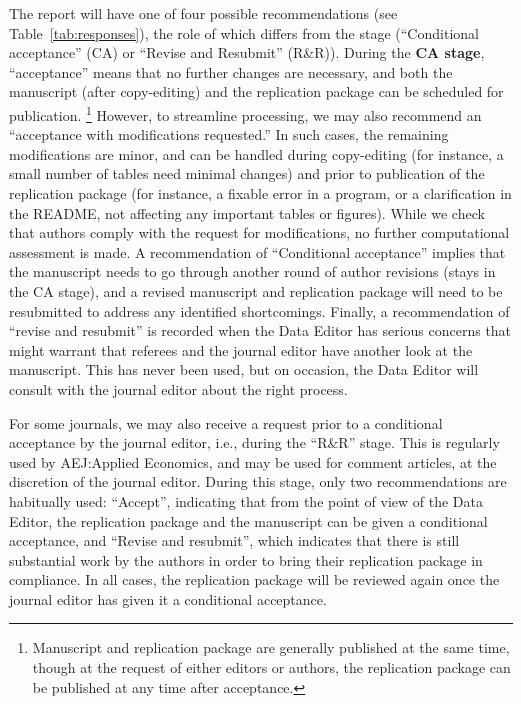 The report will have  one of four possible recommendations (see Table~\ref{tab:responses}), the role of which differs from the stage (``Conditional acceptance'' (CA) or ``Revise and Resubmit'' (R\&R)). During the  \textbf{CA stage}, ``acceptance'' means that no further changes are necessary, and both the manuscript (after copy-editing) and the replication package can be scheduled for publication.%
%
\footnote{Manuscript and replication package are generally published at the same time, though at the request of either editors or authors, the replication package can be published at any time after acceptance.} 
%
However, to streamline processing, we may also recommend an ``acceptance with modifications requested.'' In such cases, the remaining modifications are minor, and can be handled during copy-editing (for instance, a small number of tables need minimal changes) and prior to publication of the replication package (for instance, a fixable error in a program, or a clarification in the README, not affecting any important tables or figures). While we check that authors comply with the request for modifications, no further computational assessment is made. A recommendation of ``Conditional acceptance'' implies that the manuscript needs to go through another round of author revisions (stays in the CA stage), and a revised manuscript and replication package will need to be resubmitted  to address any identified shortcomings. Finally, a recommendation of  ``revise and resubmit'' is recorded when the Data Editor has serious concerns that might warrant that referees and the journal editor have another look at the manuscript. This has never been used, but on occasion, the Data Editor will consult with the journal editor about the right process. 

For some journals, we may also receive a request prior to a conditional acceptance by the journal editor, i.e., during the ``R\&R'' stage. This is regularly used by AEJ:Applied Economics, and may be used for comment articles, at the discretion of the journal editor. During this stage, only two recommendations are habitually used: ``Accept'', indicating that from the point of view of the Data Editor, the replication package and the manuscript can be given a conditional acceptance, and ``Revise and resubmit'', which indicates that there is still substantial work by the authors in order to bring their replication package in compliance. In all cases, the replication package will be reviewed again once the journal editor has given it a conditional acceptance. 



